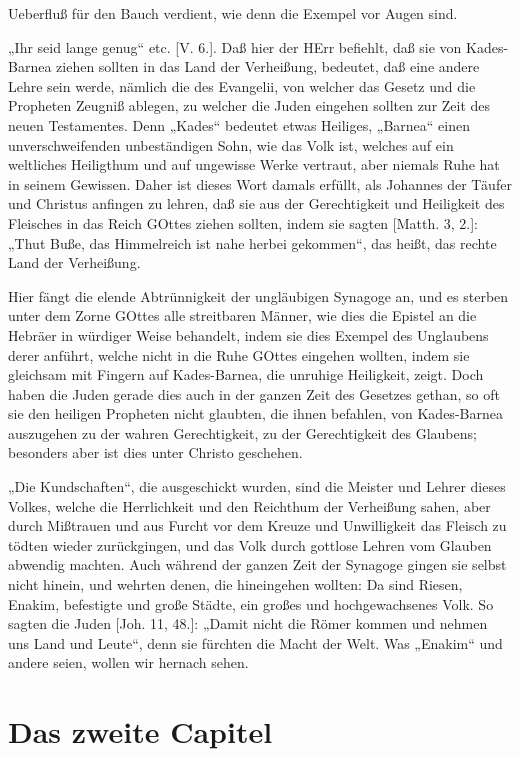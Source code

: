 Ueberfluß für den Bauch verdient, wie denn die Exempel vor Augen sind.

„Ihr seid lange genug“ etc. [V. 6.]. Daß hier der HErr befiehlt, daß sie von Kades-Barnea ziehen sollten in das Land der Verheißung, bedeutet, daß eine andere Lehre sein werde, nämlich die des Evangelii, von welcher das Gesetz und die Propheten Zeugniß ablegen, zu welcher die Juden eingehen sollten zur Zeit des neuen Testamentes. Denn „Kades“ bedeutet etwas Heiliges, „Barnea“ einen unverschweifenden unbeständigen Sohn, wie das Volk ist, welches auf ein weltliches Heiligthum und auf ungewisse Werke vertraut, aber niemals Ruhe hat in seinem Gewissen. Daher ist dieses Wort damals erfüllt, als Johannes der Täufer und Christus anfingen zu lehren, daß sie aus der Gerechtigkeit und Heiligkeit des Fleisches in das Reich GOttes ziehen sollten, indem sie sagten [Matth. 3, 2.]: „Thut Buße, das Himmelreich ist nahe herbei gekommen“, das heißt, das rechte Land der Verheißung.

Hier fängt die elende Abtrünnigkeit der ungläubigen Synagoge an, und es sterben unter dem Zorne GOttes alle streitbaren Männer, wie dies die Epistel an die Hebräer in würdiger Weise behandelt, indem sie dies Exempel des Unglaubens derer anführt, welche nicht in die Ruhe GOttes eingehen wollten, indem sie gleichsam mit Fingern auf Kades-Barnea, die unruhige Heiligkeit, zeigt. Doch haben die Juden gerade dies auch in der ganzen Zeit des Gesetzes gethan, so oft sie den heiligen Propheten nicht glaubten, die ihnen befahlen, von Kades-Barnea auszugehen zu der wahren Gerechtigkeit, zu der Gerechtigkeit des Glaubens; besonders aber ist dies unter Christo geschehen.

„Die Kundschaften“, die ausgeschickt wurden, sind die Meister und Lehrer dieses Volkes, welche die Herrlichkeit und den Reichthum der Verheißung sahen, aber durch Mißtrauen und aus Furcht vor dem Kreuze und Unwilligkeit das
Fleisch zu tödten wieder zurückgingen, und das Volk durch gottlose Lehren vom Glauben abwendig machten. Auch während der ganzen Zeit der Synagoge gingen sie selbst nicht hinein, und wehrten denen, die hineingehen wollten: Da sind Riesen, Enakim, befestigte und große Städte, ein großes und hochgewachsenes Volk. So sagten die Juden [Joh. 11, 48.]: „Damit nicht die Römer kommen und nehmen uns Land und Leute“, denn sie fürchten die Macht der Welt. Was „Enakim“ und andere seien, wollen wir hernach sehen.

\section{Das zweite Capitel}

